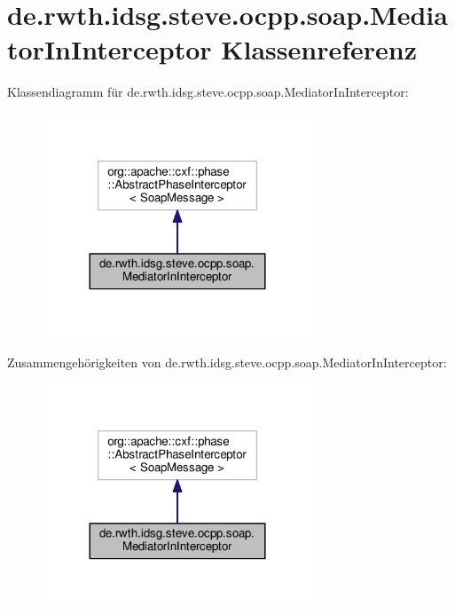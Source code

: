 \hypertarget{classde_1_1rwth_1_1idsg_1_1steve_1_1ocpp_1_1soap_1_1_mediator_in_interceptor}{\section{de.\+rwth.\+idsg.\+steve.\+ocpp.\+soap.\+Mediator\+In\+Interceptor Klassenreferenz}
\label{classde_1_1rwth_1_1idsg_1_1steve_1_1ocpp_1_1soap_1_1_mediator_in_interceptor}
}


Klassendiagramm für de.\+rwth.\+idsg.\+steve.\+ocpp.\+soap.\+Mediator\+In\+Interceptor\+:\nopagebreak
\begin{figure}[H]
\begin{center}
\leavevmode
\includegraphics[width=228pt]{classde_1_1rwth_1_1idsg_1_1steve_1_1ocpp_1_1soap_1_1_mediator_in_interceptor__inherit__graph}
\end{center}
\end{figure}


Zusammengehörigkeiten von de.\+rwth.\+idsg.\+steve.\+ocpp.\+soap.\+Mediator\+In\+Interceptor\+:\nopagebreak
\begin{figure}[H]
\begin{center}
\leavevmode
\includegraphics[width=228pt]{classde_1_1rwth_1_1idsg_1_1steve_1_1ocpp_1_1soap_1_1_mediator_in_interceptor__coll__graph}
\end{center}
\end{figure}

